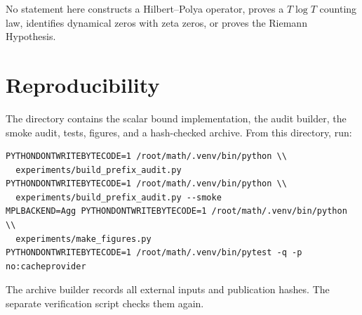 \documentclass[11pt]{article}
\theoremstyle{definition}
\theoremstyle{remark}
\begin{document}
No statement here constructs a Hilbert--Polya operator, proves a
$T\log T$ counting law, identifies dynamical zeros with zeta zeros, or proves
the Riemann Hypothesis.

\section{Reproducibility}

The directory contains the scalar bound implementation, the audit builder,
the smoke audit, tests, figures, and a hash-checked archive.  From this
directory, run:
\begin{verbatim}
PYTHONDONTWRITEBYTECODE=1 /root/math/.venv/bin/python \\
  experiments/build_prefix_audit.py
PYTHONDONTWRITEBYTECODE=1 /root/math/.venv/bin/python \\
  experiments/build_prefix_audit.py --smoke
MPLBACKEND=Agg PYTHONDONTWRITEBYTECODE=1 /root/math/.venv/bin/python \\
  experiments/make_figures.py
PYTHONDONTWRITEBYTECODE=1 /root/math/.venv/bin/pytest -q -p no:cacheprovider
\end{verbatim}
The archive builder records all external inputs and publication hashes.  The
separate verification script checks them again.



\end{document}
